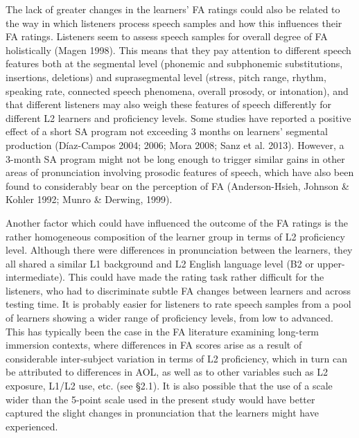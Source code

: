 \documentclass[12pt]{article}
\newenvironment{styleStandard}{\setlength\leftskip{0cm}\setlength\rightskip{0cm plus 1fil}\setlength\parindent{0cm}\setlength\parfillskip{0pt plus 1fil}\setlength\parskip{0in plus 1pt}\writerlistparindent\writerlistleftskip\leavevmode\normalfont\normalsize\writerlistlabel\ignorespaces}{\unskip\vspace{0.111in plus 0.0111in}\par}
\newcommand\writerlistleftskip{}
\newcommand\writerlistparindent{}
\newcommand\writerlistlabel{}
\begin{document}
\begin{styleStandard}
The lack of greater changes in the learners’ FA ratings could also be related to the way in which listeners process speech samples and how this influences their FA ratings. Listeners seem to assess speech samples for overall degree of FA holistically (Magen 1998). This means that they pay attention to different speech features both at the segmental level (phonemic and subphonemic substitutions, insertions, deletions) and suprasegmental level (stress, pitch range, rhythm, speaking rate, connected speech phenomena, overall prosody, or intonation), and that different listeners may also weigh these features of speech differently for different L2 learners and proficiency levels. Some studies have reported a positive effect of a short SA program not exceeding 3 months on learners’ segmental production (Díaz-Campos 2004; 2006; Mora 2008; Sanz et al. 2013). However, a 3-month SA program might not be long enough to trigger similar gains in other areas of pronunciation involving prosodic features of speech, which have also been found to considerably bear on the perception of FA (Anderson-Hsieh, Johnson \& Kohler 1992; Munro \& Derwing, 1999).
\end{styleStandard}

\begin{styleStandard}
Another factor which could have influenced the outcome of the FA ratings is the rather homogeneous composition of the learner group in terms of L2 proficiency level. Although there were differences in pronunciation between the learners, they all shared a similar L1 background and L2 English language level (B2 or upper-intermediate). This could have made the rating task rather difficult for the listeners, who had to discriminate subtle FA changes between learners and across testing time. It is probably easier for listeners to rate speech samples from a pool of learners showing a wider range of proficiency levels, from low to advanced. This has typically been the case in the FA literature examining long-term immersion contexts, where differences in FA scores arise as a result of considerable inter-subject variation in terms of L2 proficiency, which in turn can be attributed to differences in AOL, as well as to other variables such as L2 exposure, L1/L2 use, etc. (see §2.1). It is also possible that the use of a scale wider than the 5-point scale used in the present study would have better captured the slight changes in pronunciation that the learners might have experienced. \ 
\end{styleStandard}
\end{document}

